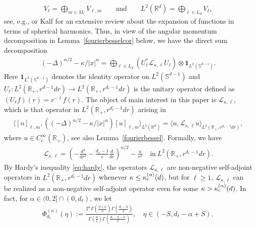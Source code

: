 \documentclass[12pt,reqno]{amsart}
\theoremstyle{definition}
\theoremstyle{remark}
\numberwithin{equation}{section}
\newcommand{\1}{\mathbbm{1}}
\newcommand{\R}{\mathbb{R}}
\def\bs{\mathbb{S}}
\def\cl{\mathcal{L}}
\newcommand{\one}{\mathbf{1}}
\begin{document}
\begin{align}
  \label{eq:directsumvell}
  V_\ell= \bigoplus_{m\in M_\ell}  V_{\ell,m}
  \qquad \text{and} \qquad
  L^2(\R^d) = \bigoplus_{\ell\in L_d}V_{\ell},
\end{align}
see, e.g., \cite{BogdanMerz2024} or Kalf \cite{Kalf1995} for an extensive review about the expansion of functions in terms of spherical harmonics.
Thus, in view of the angular momentum decomposition in Lemma~\ref{fourierbesselcor} below, we have the direct sum decomposition
\begin{align}
  \label{eq:angularmomentumdecomposition}
  (-\Delta)^{\alpha/2} - \kappa/|x|^\alpha
  = \bigoplus_{\ell\in L_d} (U_\ell^*\cl_{\kappa,\ell} U_\ell)\otimes\one_{L^2(\bs^{d-1})}.
\end{align}
Here $\one_{L^2(\bs^{d-1})}$ denotes the identity operator on $L^2(\bs^{d-1})$ and $U_\ell:L^2(\R_+,r^{d-1}dr)\to L^2(\R_+,r^{d_\ell-1}dr)$ is the unitary operator defined as $(U_\ell f)(r)=r^{-\ell}f(r)$. The object of main interest in this paper is $\cl_{\kappa,\ell}$, which is that operator in $L^2(\R_+,r^{d_\ell-1}dr)$ arising in
\begin{align}
  \label{eq:lkappaell}
  \langle[u]_{\ell,m},((-\Delta)^{\alpha/2}-\kappa/|x|^\alpha)[u]_{\ell,m}\rangle_{L^2(\R^d)} = \langle u,\cl_{\kappa,\ell}u\rangle_{L^2(\R_+,r^{d_\ell-1}dr)}, 
\end{align}
where $u\in C_c^\infty(\R_+)$, see also Lemma~\ref{fourierbessel}. Formally, we have
\begin{align}
  \label{eq:deflkappaell}
  \cl_{\kappa,\ell} = \left(-\frac{d^2}{dr^2}-\frac{d_\ell-1}{r}\frac{d}{dr}\right)^{\alpha/2} - \frac{\kappa}{r^\alpha} \quad \text{in} \ L^2(\R_+,r^{d_\ell-1}dr).
\end{align}
By Hardy's inequality \eqref{eq:hardy}, the operators $\cl_{\kappa,\ell}$ are non-negative self-adjoint operators in $L^2(\R_+,r^{d_\ell-1}dr)$ whenever $\kappa\leq\kappa_{\rm c}^{(\alpha)}(d)$, but for $\ell\geq1$, $\cl_{\kappa,\ell}$ can be realized as a non-negative self-adjoint operator even for some $\kappa>\kappa_{\rm c}^{(\alpha)}(d)$. In fact, for $\alpha\in(0,2]\cap(0,d_\ell)$, we let
\begin{align}
  \label{eq:defsigmagammal}
  \Phi_{d_\ell}^{(\alpha)}(\eta) 
  := \frac{2^{\alpha} \Gamma\left(\frac{\eta+\alpha}{2}\right) \Gamma \left(\frac{d_\ell-\eta}{2}\right)}{\Gamma \left(\frac{\eta}{2}\right) \Gamma \left(\frac{d_\ell-\eta-\alpha}{2}\right)},
  \quad \eta \in (-S,d_\ell-\alpha+S),
\end{align}
\end{document}
